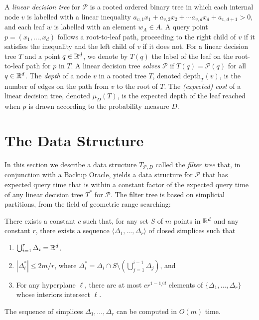 \documentclass{patmorin}
\newcommand{\depth}{\mathrm{depth}}
\begin{document}
A \emph{linear decision tree} for $\mathcal{P}$ is a rooted ordered
binary tree in which each internal node $v$ is labelled with a linear
inequality $a_{v,1}x_1 + a_{v,2}x_2 + \cdots a_{v,d}x_d + a_{v,d+1} > 0$,
and each leaf $w$ is labelled with an element $w_A\in A$.  A query point
$p=(x_1,\ldots,x_d)$ follows a root-to-leaf path, proceeding to the right
child of $v$ if it satisfies the inequality and the left child of $v$
if it does not.  For a linear decision tree $T$ and a point $q\in\mathbb{R}^d$,
we denote by $T(q)$ the label of the leaf on the root-to-leaf path
for $p$ in $T$.  A linear decision tree \emph{solves} $\mathcal{P}$ if
$T(q)=\mathcal{P}(q)$ for all $q\in\mathbb{R}^d$. The \emph{depth} of a node $v$
in a rooted tree $T$, denoted $\depth_T(v)$, is the number of edges on
the path from $v$ to the root of $T$.  The \emph{(expected) cost} of a
linear decision tree, denoted $\mu_D(T)$, is the expected depth of the
leaf reached when $p$ is drawn according to the probability measure $D$.


\section{The Data Structure}

In this section we describe a data structure $T_{\mathcal{P},D}$ called
the \emph{filter tree} that, in conjunction with a Backup Oracle, yields
a data structure for $\mathcal{P}$ that has expected query time that
is within a constant factor of the expected query time of any linear
decision tree $T^*$ for $\mathcal{P}$.  The filter tree is based on
simplicial partitions, from the field of geometric range searching:

\begin{thm}[Matou\v{s}ek 1992]
There exists a constant $c$ such that, for any set $S$ of $m$
points in $\mathbb{R}^d$ and any constant $r$, there exists a sequence
$\langle \Delta_1,\ldots,\Delta_r\rangle$ of closed simplices such that
  \begin{enumerate}
    \item $\bigcup_{i=1}^r \Delta_i = \mathbb{R}^d$,
    \item $|\Delta_i^*| \le 2m/r$, where $\Delta_i^*=\Delta_i \cap S\setminus
    \left(\bigcup_{j=1}^{i-1}\Delta_j\right)$, and
    \item For any hyperplane $\ell$, there are at most $cr^{1-1/d}$ elements of
  $\{\Delta_1,\ldots,\Delta_r\}$ whose interiors intersect $\ell$.
  \end{enumerate}
  The sequence of simplices $\Delta_1,\ldots,\Delta_r$ can be computed
  in $O(m)$ time.
\end{thm}
\end{document}
